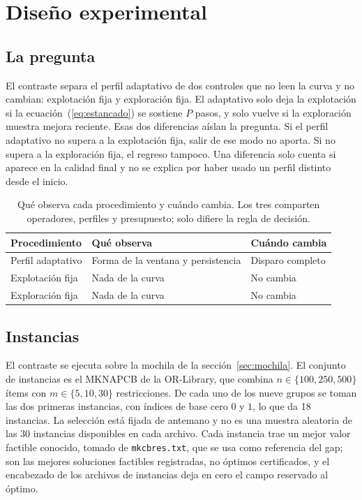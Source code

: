 \documentclass[runningheads]{llncs}
\begin{document}
\section{Diseño experimental}
\label{sec:diseno}

\subsection{La pregunta}
\label{sec:pregunta}

El contraste separa el perfil adaptativo de dos controles que no leen la curva y no cambian: explotación fija y exploración fija. El adaptativo solo deja la explotación si la ecuación~(\ref{eq:estancado}) se sostiene $P$ pasos, y solo vuelve si la exploración muestra mejora reciente. Esas dos diferencias aíslan la pregunta. Si el perfil adaptativo no supera a la explotación fija, salir de ese modo no aporta. Si no supera a la exploración fija, el regreso tampoco. Una diferencia solo cuenta si aparece en la calidad final y no se explica por haber usado un perfil distinto desde el inicio.

\begin{table}
\caption{Qué observa cada procedimiento y cuándo cambia. Los tres comparten operadores, perfiles y presupuesto; solo difiere la regla de decisión.}
\label{tab:controles}
\begin{tabular}{lll}
\toprule
Procedimiento & Qué observa & Cuándo cambia \\
\midrule
Perfil adaptativo & Forma de la ventana y persistencia & Disparo completo \\
Explotación fija & Nada de la curva & No cambia \\
Exploración fija & Nada de la curva & No cambia \\
\bottomrule
\end{tabular}
\end{table}

\subsection{Instancias}
\label{sec:dominios}

El contraste se ejecuta sobre la mochila de la sección~\ref{sec:mochila}. El conjunto de instancias es el MKNAPCB de la OR-Library, que combina $n \in \{100, 250, 500\}$ ítems con $m \in \{5, 10, 30\}$ restricciones. De cada uno de los nueve grupos se toman las dos primeras instancias, con índices de base cero $0$ y $1$, lo que da 18 instancias. La selección está fijada de antemano y no es una muestra aleatoria de las 30 instancias disponibles en cada archivo. Cada instancia trae un mejor valor factible conocido, tomado de \texttt{mkcbres.txt}, que se usa como referencia del gap; son las mejores soluciones factibles registradas, no óptimos certificados, y el encabezado de los archivos de instancias deja en cero el campo reservado al óptimo.
\end{document}
